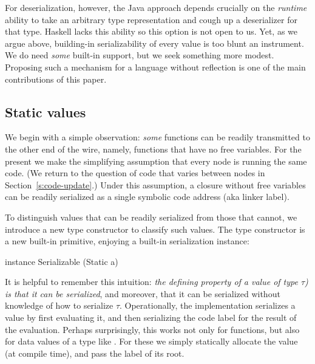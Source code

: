 \documentclass{sigplanconf}
\begin{document}
For deserialization, however, the Java approach depends crucially on the \emph{runtime} ability
to take an arbitrary type representation and cough up a deserializer for that type.
Haskell lacks this ability so this option is not open to us.
Yet, as we argue above, building-in serializability of every value is
too blunt an instrument.  We do need \emph{some} built-in support, but
we seek something more modest.  Proposing such a mechanism for a language without reflection is one of 
the main contributions of this paper.

\subsection{Static values}

We begin with a simple observation: \emph{some} functions can be readily
transmitted to the other end of the wire, namely, functions that have no
free variables.  For the present we make the simplifying assumption that every node is running the same code.  (We return to the question
of code that varies between nodes in Section~\ref{s:code-update}.)
Under this assumption, a closure without free variables can be
readily serialized as a single symbolic code address (aka linker label).

\lstset{mathescape=true}

To distinguish values that can be readily serialized from those that cannot, we introduce a new type constructor
 to classify such values.  The type 
constructor  is a new built-in primitive, 
enjoying a built-in serialization instance:
\begin{code}
  instance Serializable (Static a)
\end{code}
It is helpful to remember this intuition: \emph{the defining property of
a value of type \emph{ $\tau$)} is that it can be serialized},
and moreover, that it can be serialized without knowledge of how to serialize $\tau$.
Operationally, the implementation serializes a  value by first evaluating it,
and then serializing the code label for the result of the evaluation.
Perhaps surprisingly, this works not only for functions, but also for data values of a type like .
For these we simply statically allocate the  value (at compile time), and pass the label of its root.
\end{document}
